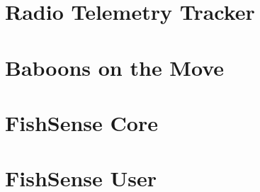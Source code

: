 \section{Radio Telemetry Tracker}

\section{Baboons on the Move}

\section{FishSense Core}

\section{FishSense User}

